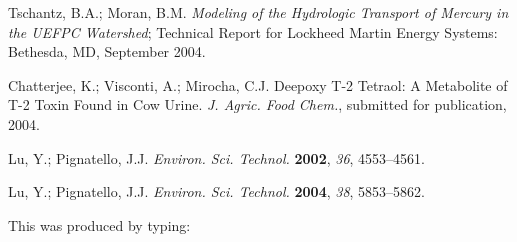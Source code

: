 \documentclass[]{interact}
\theoremstyle{plain}%
\theoremstyle{definition}
\theoremstyle{remark}
\begin{document}
\begin{thebibliography}{99}
Tschantz, B.A.; Moran, B.M. \emph{Modeling of the Hydrologic Transport of
  Mercury in the UEFPC Watershed}; Technical Report for Lockheed Martin Energy 
  Systems: Bethesda, MD, September 2004.

Chatterjee, K.; Visconti, A.; Mirocha, C.J. Deepoxy T-2 Tetraol: A Metabolite
  of T-2 Toxin Found in Cow Urine. \emph{J. Agric. Food Chem.}, submitted for
  publication, 2004.

Lu, Y.; Pignatello, J.J. \emph{Environ. Sci. Technol.} \textbf{2002},
  \emph{36}, 4553--4561.

Lu, Y.; Pignatello, J.J. \emph{Environ. Sci. Technol.} \textbf{2004},
  \emph{38}, 5853--5862.

\end{thebibliography}
\bigskip
\noindent This was produced by typing:
\end{document}
